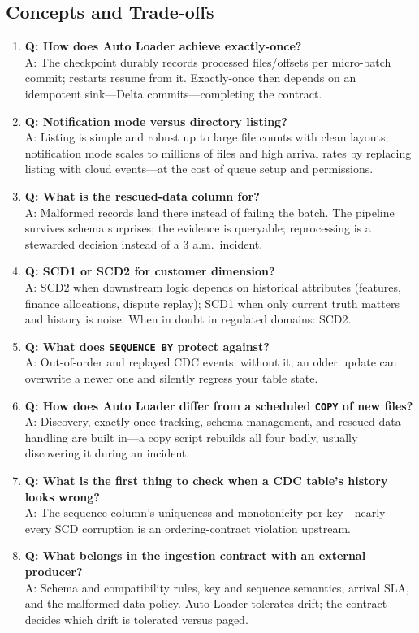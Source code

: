 \subsection{Concepts and Trade-offs}
\begin{enumerate}
    \item \textbf{Q: How does Auto Loader achieve exactly-once?}\\
    A: The checkpoint durably records processed files/offsets per micro-batch commit; restarts resume from it. Exactly-once then depends on an idempotent sink---Delta commits---completing the contract.
    \item \textbf{Q: Notification mode versus directory listing?}\\
    A: Listing is simple and robust up to large file counts with clean layouts; notification mode scales to millions of files and high arrival rates by replacing listing with cloud events---at the cost of queue setup and permissions.
    \item \textbf{Q: What is the rescued-data column for?}\\
    A: Malformed records land there instead of failing the batch. The pipeline survives schema surprises; the evidence is queryable; reprocessing is a stewarded decision instead of a 3 a.m.\ incident.
    \item \textbf{Q: SCD1 or SCD2 for customer dimension?}\\
    A: SCD2 when downstream logic depends on historical attributes (features, finance allocations, dispute replay); SCD1 when only current truth matters and history is noise. When in doubt in regulated domains: SCD2.
    \item \textbf{Q: What does \texttt{SEQUENCE BY} protect against?}\\
    A: Out-of-order and replayed CDC events: without it, an older update can overwrite a newer one and silently regress your table state.
    \item \textbf{Q: How does Auto Loader differ from a scheduled \texttt{COPY} of new files?}\\
    A: Discovery, exactly-once tracking, schema management, and rescued-data handling are built in---a copy script rebuilds all four badly, usually discovering it during an incident.
    \item \textbf{Q: What is the first thing to check when a CDC table's history looks wrong?}\\
    A: The sequence column's uniqueness and monotonicity per key---nearly every SCD corruption is an ordering-contract violation upstream.
    \item \textbf{Q: What belongs in the ingestion contract with an external producer?}\\
    A: Schema and compatibility rules, key and sequence semantics, arrival SLA, and the malformed-data policy. Auto Loader tolerates drift; the contract decides which drift is tolerated versus paged.
\end{enumerate}

